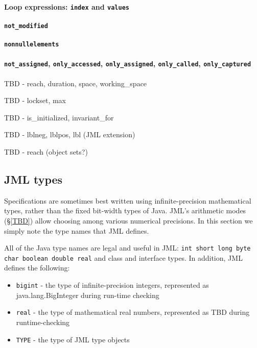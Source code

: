 \paragraph{Loop expressions: \texttt{\bs index} and \texttt{\bs values}}


\paragraph{\texttt{\bs not\_modified}}

\paragraph{\texttt{\bs nonnullelements}}

\paragraph{\texttt{\bs not\_assigned}, \texttt{\bs only\_accessed}, \texttt{\bs only\_assigned}, \texttt{\bs only\_called}, \texttt{\bs only\_captured}}

TBD - reach, duration, space, working\_space

TBD - lockset, max

TBD - is\_initialized, invariant\_for

TBD - lblneg, lblpos, lbl (JML extension)

TBD - reach (object sets?)

\subsection{JML types}
Specifications are sometimes best written using infinite-precision mathematical types, rather than the fixed bit-width types of Java.
JML's arithmetic modes (\S\ref{TBD}) allow choosing among various numerical precisions.
In this section we simply note the type names that JML defines.

All of the Java type names are legal and useful in JML: \texttt{int short long byte char boolean double real} and class and interface types. In addition, JML defines the following:
\begin{itemize}
\item \texttt{\bs bigint} - the type of infinite-precision integers, represented as java.lang.BigInteger during run-time checking
\item \texttt{\bs real} - the type of mathematical real numbers, represented as TBD during runtime-checking
\item \texttt{\bs TYPE} - the type of JML type objects
\end{itemize}

